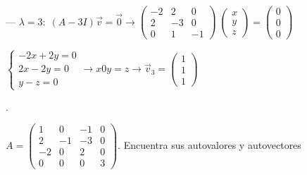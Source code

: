 \begin{proofw}
\noindent --- $\lambda=3:\; (A-3I)\vec v =\vec 0 \to \left( \begin{matrix} -2&2&0\\2&-3&0\\0&1&-1 \end{matrix} \right) \; \left( \begin{matrix} x\\y\\z \end{matrix} \right)=\left( \begin{matrix} 0\\0\\0 \end{matrix} \right)$

\noindent $\begin{cases} -2x+2y=0\\2x-2y=0\\y-z=0 \end{cases} \to x0y=z \to \vec v_{3}= \left( \begin{matrix} 1\\1\\1 \end{matrix} \right)$

\end{proofw}


\begin{ejre}.

	$A=\left( \begin{matrix} 1&0&-1&0\\2&-1&-3&0\\-2&0&2&0\\0&0&0&3 \end{matrix} \right)$. Encuentra sus autovalores y autovectores
\end{ejre}

